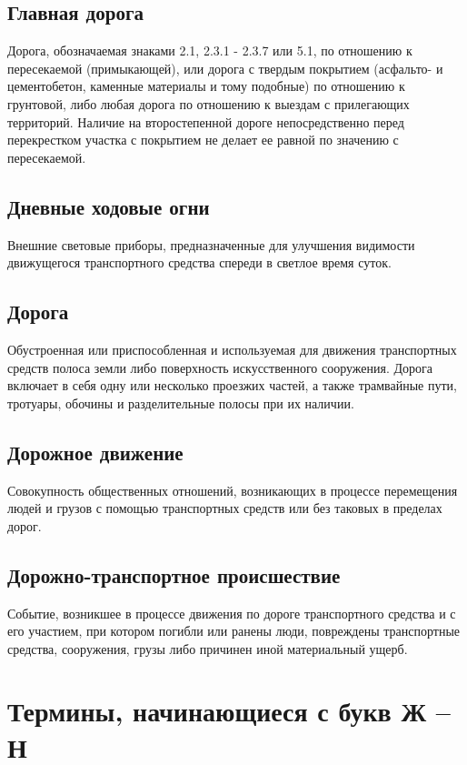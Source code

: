 \documentclass[russian,english,12pt,a4paper,reqno,dviphfm,oneside]{book}
\begin{document}
{\subsection{Главная дорога}
Дорога, обозначаемая знаками 2.1, 2.3.1 - 2.3.7 или 5.1, по отношению к пересекаемой (примыкающей), или дорога с твердым покрытием (асфальто- и цементобетон, каменные материалы и тому подобные) по отношению к грунтовой, либо любая дорога по отношению к выездам с прилегающих территорий. Наличие на второстепенной дороге непосредственно перед перекрестком участка с покрытием не делает ее равной по значению с пересекаемой.

\subsection{Дневные ходовые огни}
Внешние световые приборы, предназначенные для улучшения видимости движущегося транспортного средства спереди в светлое время суток.

\subsection{Дорога}
Обустроенная или приспособленная и используемая для движения транспортных средств полоса земли либо поверхность искусственного сооружения. Дорога включает в себя одну или несколько проезжих частей, а также трамвайные пути, тротуары, обочины и разделительные полосы при их наличии.

\subsection{Дорожное движение}
Совокупность общественных отношений, возникающих в процессе перемещения людей и грузов с помощью транспортных средств или без таковых в пределах дорог.

\subsection{Дорожно-транспортное происшествие}
Событие, возникшее в процессе движения по дороге транспортного средства и с его участием, при котором погибли или ранены люди, повреждены транспортные средства, сооружения, грузы либо причинен иной материальный ущерб.

\newpage
\section{Термины, начинающиеся с букв Ж -- Н}

}
\end{document}
